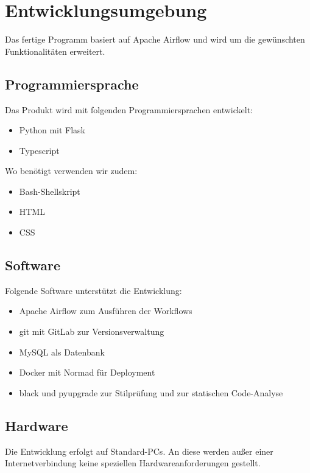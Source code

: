 \chapter{Entwicklungsumgebung}
Das fertige Programm basiert auf \gls{Apache Airflow} und wird um die gewünschten Funktionalitäten erweitert.
\section{Programmiersprache}
Das Produkt wird mit folgenden Programmiersprachen entwickelt:
\begin{itemize}
    \setlength\itemsep{-1em}
    \item Python mit Flask
    \item Typescript
\end{itemize}
Wo benötigt verwenden wir zudem:
\begin{itemize}
    \setlength\itemsep{-1em}
    \item Bash-Shellskript 
    \item HTML
    \item CSS
\end{itemize}
\newpage
\section{Software}
Folgende Software unterstützt die Entwicklung:
\begin{itemize}
    \setlength\itemsep{-1em}
    \item Apache Airflow zum Ausführen der \glspl{Workflow}
    \item git mit GitLab zur Versionsverwaltung
    \item MySQL als Datenbank
    \item Docker mit Normad für Deployment
    \item black und pyupgrade zur Stilprüfung und zur statischen Code-Analyse
\end{itemize}


\section{Hardware}
Die Entwicklung erfolgt auf Standard-PCs. An diese werden außer einer Internetverbindung keine speziellen Hardwareanforderungen gestellt.
